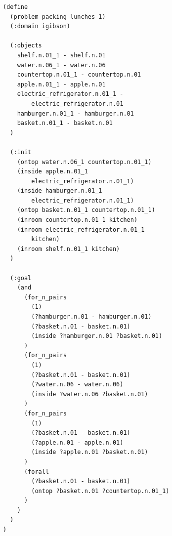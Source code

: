 \begin{minipage}[t]{.45\textwidth}
\begin{lstlisting}[style = mystyle, caption={{\texttt{PackingLunch}}}, label={lst:bddl1}]
(define 
  (problem packing_lunches_1)
  (:domain igibson)
    
  (:objects
    shelf.n.01_1 - shelf.n.01
    water.n.06_1 - water.n.06
    countertop.n.01_1 - countertop.n.01
    apple.n.01_1 - apple.n.01
    electric_refrigerator.n.01_1 - 
        electric_refrigerator.n.01
    hamburger.n.01_1 - hamburger.n.01
    basket.n.01_1 - basket.n.01
  )
    
  (:init 
    (ontop water.n.06_1 countertop.n.01_1)
    (inside apple.n.01_1 
        electric_refrigerator.n.01_1)
    (inside hamburger.n.01_1 
        electric_refrigerator.n.01_1)
    (ontop basket.n.01_1 countertop.n.01_1) 
    (inroom countertop.n.01_1 kitchen) 
    (inroom electric_refrigerator.n.01_1 
        kitchen) 
    (inroom shelf.n.01_1 kitchen)
  )
    
  (:goal 
    (and 
      (for_n_pairs
        (1)
        (?hamburger.n.01 - hamburger.n.01)
        (?basket.n.01 - basket.n.01)
        (inside ?hamburger.n.01 ?basket.n.01)
      )
      (for_n_pairs 
        (1) 
        (?basket.n.01 - basket.n.01) 
        (?water.n.06 - water.n.06) 
        (inside ?water.n.06 ?basket.n.01)
      ) 
      (for_n_pairs 
        (1) 
        (?basket.n.01 - basket.n.01) 
        (?apple.n.01 - apple.n.01) 
        (inside ?apple.n.01 ?basket.n.01)
      ) 
      (forall 
        (?basket.n.01 - basket.n.01) 
        (ontop ?basket.n.01 ?countertop.n.01_1) 
      )
    )
  )
)
\end{lstlisting}
\end{minipage}\hfill
